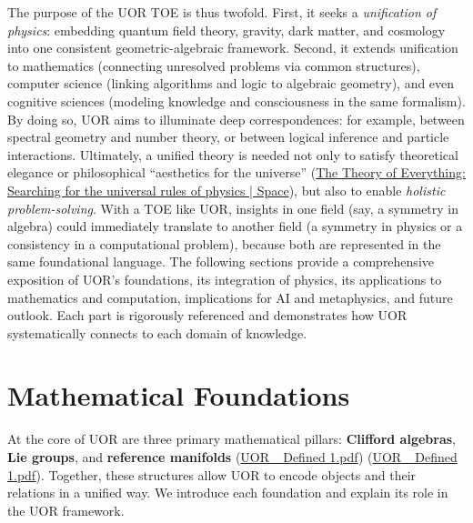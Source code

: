 \documentclass[12pt]{article}
\begin{document}
The purpose of the UOR TOE is thus twofold. First, it seeks a \emph{unification of physics}: embedding quantum field theory, gravity, dark matter, and cosmology into one consistent geometric-algebraic framework. Second, it extends unification to mathematics (connecting unresolved problems via common structures), computer science (linking algorithms and logic to algebraic geometry), and even cognitive sciences (modeling knowledge and consciousness in the same formalism). By doing so, UOR aims to illuminate deep correspondences: for example, between spectral geometry and number theory, or between logical inference and particle interactions. Ultimately, a unified theory is needed not only to satisfy theoretical elegance or philosophical ``aesthetics for the universe'' (\href{https://www.space.com/theory-of-everything-definition.html#:~:text=Cambridge%20University%20astrophysicist%20Christopher%20Reynolds,of%20general%20relativity%20with%20quantum}{The Theory of Everything: Searching for the universal rules of physics | Space}), but also to enable \emph{holistic problem-solving}. With a TOE like UOR, insights in one field (say, a symmetry in algebra) could immediately translate to another field (a symmetry in physics or a consistency in a computational problem), because both are represented in the same foundational language. The following sections provide a comprehensive exposition of UOR’s foundations, its integration of physics, its applications to mathematics and computation, implications for AI and metaphysics, and future outlook. Each part is rigorously referenced and demonstrates how UOR systematically connects to each domain of knowledge.

\section{Mathematical Foundations}

At the core of UOR are three primary mathematical pillars: \textbf{Clifford algebras}, \textbf{Lie groups}, and \textbf{reference manifolds} (\href{file://file-XiorGa5Wu6KTrCZGytuVSc#:~:text=The%20Universal%20Object%20Reference%20,on%20three%20primary%20mathematical%20foundations}{UOR\_ Defined 1.pdf}) (\href{file://file-XiorGa5Wu6KTrCZGytuVSc#:~:text=%E2%97%8F%20Lie%20groups%20to%20represent,which%20objects%20are%20situated%20and}{UOR\_ Defined 1.pdf}). Together, these structures allow UOR to encode objects and their relations in a unified way. We introduce each foundation and explain its role in the UOR framework.
\end{document}
